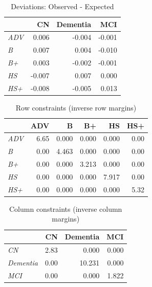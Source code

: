 \documentclass[
  ignorenonframetext,
]{beamer}
\begin{document}
\begin{frame}

\begin{table}[t]

\caption{\label{tab:edu_dx_chi2_z}Deviations: Observed - Expected}
\centering
\begin{tabular}{>{\em}lrrr}
\toprule
  & CN & Dementia & MCI\\
\midrule
ADV & 0.006 & -0.004 & -0.001\\
B & 0.007 & 0.004 & -0.010\\
B+ & 0.003 & -0.002 & -0.001\\
HS & -0.007 & 0.007 & 0.000\\
HS+ & -0.008 & -0.005 & 0.013\\
\bottomrule
\end{tabular}
\end{table}

\end{frame}

\begin{frame}

\begin{table}[t]

\caption{\label{tab:edu_dx_chi2_rowconstraints}Row constraints (inverse row margins)}
\centering
\begin{tabular}{>{\em}lrrrrr}
\toprule
  & ADV & B & B+ & HS & HS+\\
\midrule
ADV & 6.65 & 0.000 & 0.000 & 0.000 & 0.00\\
B & 0.00 & 4.463 & 0.000 & 0.000 & 0.00\\
B+ & 0.00 & 0.000 & 3.213 & 0.000 & 0.00\\
HS & 0.00 & 0.000 & 0.000 & 7.917 & 0.00\\
HS+ & 0.00 & 0.000 & 0.000 & 0.000 & 5.32\\
\bottomrule
\end{tabular}
\end{table}

\end{frame}

\begin{frame}

\begin{table}[t]

\caption{\label{tab:edu_dx_chi2_colconstraints}Column constraints (inverse column margins)}
\centering
\begin{tabular}{>{\em}lrrr}
\toprule
  & CN & Dementia & MCI\\
\midrule
CN & 2.83 & 0.000 & 0.000\\
Dementia & 0.00 & 10.231 & 0.000\\
MCI & 0.00 & 0.000 & 1.822\\
\bottomrule
\end{tabular}
\end{table}

\end{frame}
\end{document}
